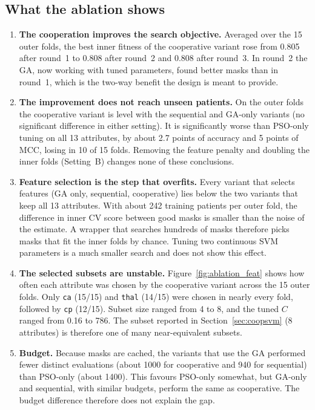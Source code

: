 \documentclass[MTech]{ugthesis}
\begin{document}
\subsection{What the ablation shows}
\begin{enumerate}
\item \textbf{The cooperation improves the search objective.} Averaged over the 15 outer folds, the best inner fitness of the cooperative variant rose from 0.805 after round~1 to 0.808 after round~2 and 0.808 after round~3. In round~2 the GA, now working with tuned parameters, found better masks than in round~1, which is the two-way benefit the design is meant to provide.
\item \textbf{The improvement does not reach unseen patients.} On the outer folds the cooperative variant is level with the sequential and GA-only variants (no significant difference in either setting). It is significantly worse than PSO-only tuning on all 13 attributes, by about 2.7 points of accuracy and 5 points of MCC, losing in 10 of 15 folds. Removing the feature penalty and doubling the inner folds (Setting~B) changes none of these conclusions.
\item \textbf{Feature selection is the step that overfits.} Every variant that selects features (GA only, sequential, cooperative) lies below the two variants that keep all 13 attributes. With about 242 training patients per outer fold, the difference in inner CV score between good masks is smaller than the noise of the estimate. A wrapper that searches hundreds of masks therefore picks masks that fit the inner folds by chance. Tuning two continuous SVM parameters is a much smaller search and does not show this effect.
\item \textbf{The selected subsets are unstable.} Figure~\ref{fig:ablation_feat} shows how often each attribute was chosen by the cooperative variant across the 15 outer folds. Only \texttt{ca} (15/15) and \texttt{thal} (14/15) were chosen in nearly every fold, followed by \texttt{cp} (12/15). Subset size ranged from 4 to 8, and the tuned $C$ ranged from 0.16 to 786. The subset reported in Section~\ref{sec:coopsvm} (8 attributes) is therefore one of many near-equivalent subsets.
\item \textbf{Budget.} Because masks are cached, the variants that use the GA performed fewer distinct evaluations (about 1000 for cooperative and 940 for sequential) than PSO-only (about 1400). This favours PSO-only somewhat, but GA-only and sequential, with similar budgets, perform the same as cooperative. The budget difference therefore does not explain the gap.
\end{enumerate}
\end{document}
